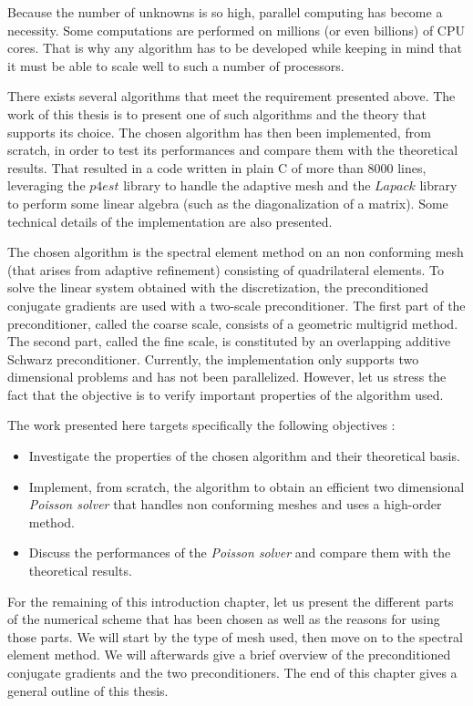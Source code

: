 Because the number of unknowns is so high, parallel computing has become a necessity. Some computations are performed on millions (or even billions) of CPU cores. That is why any algorithm has to be developed while keeping in mind that it must be able to scale well to such a number of processors. 

There exists several algorithms that meet the requirement presented above. The work of this thesis is to present one of such algorithms and the theory that supports its choice. The chosen algorithm has then been implemented, from scratch, in order to test its performances and compare them with the theoretical results. That resulted in a code written in plain C of more than 8000 lines, leveraging the $p4est$ library to handle the adaptive mesh and the $Lapack$ library to perform some linear algebra (such as the diagonalization of a matrix). Some technical details of the implementation are also presented. 

The chosen algorithm is the spectral element method on an non conforming mesh (that arises from adaptive refinement) consisting of quadrilateral elements. To solve the linear system obtained with the discretization, the preconditioned conjugate gradients are used with a two-scale preconditioner. The first part of the preconditioner, called the coarse scale, consists of a geometric multigrid method. The second part, called the fine scale, is constituted by an overlapping additive Schwarz preconditioner. Currently, the implementation only supports two dimensional problems and has not been parallelized. However, let us stress the fact that the objective is to verify important properties of the algorithm used.

The work presented here targets specifically the following objectives : 
\begin{itemize}
\item Investigate the properties of the chosen algorithm and their theoretical basis.
\item Implement, from scratch, the algorithm to obtain an efficient two dimensional \textit{Poisson solver} that handles non conforming meshes and uses a high-order method.
\item Discuss the performances of the \textit{Poisson solver} and compare them with the theoretical results. 
\end{itemize}


For the remaining of this introduction chapter, let us present the different parts of the numerical scheme that has been chosen as well as the reasons for using those parts. We will start by the type of mesh used, then move on to the spectral element method. We will afterwards give a brief overview of the preconditioned conjugate gradients and the two preconditioners. The end of this chapter gives a general outline of this thesis. 



